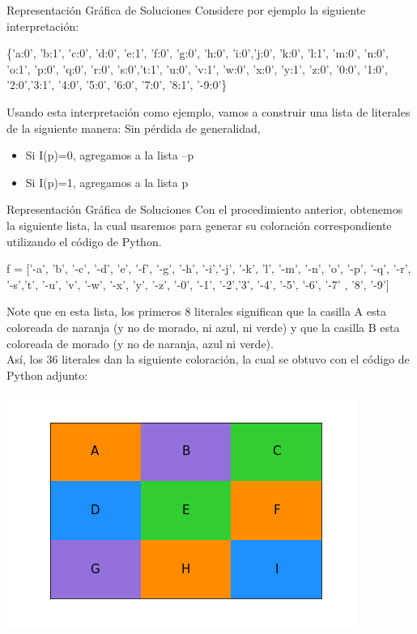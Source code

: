 \documentclass[10pt]{beamer}
\begin{document}
\begin{frame}{Representación Gráfica de Soluciones}
Considere por ejemplo la siguiente interpretación: \\
\begin{block}{}
 \{'a:0', 'b:1', 'c:0', 'd:0', 'e:1', 'f:0', 'g:0', 'h:0', 'i:0','j:0', 'k:0', 'l:1',
      'm:0', 'n:0', 'o:1', 'p:0', 'q:0', 'r:0', 's:0','t:1', 'u:0', 'v:1', 'w:0', 'x:0', 'y:1', 'z:0', '0:0', '1:0', '2:0','3:1', '4:0', '5:0', '6:0', '7:0', '8:1', '-9:0'\}
\end{block}
Usando esta interpretación como ejemplo, vamos a construir una lista de literales de la siguiente manera:
Sin pérdida de generalidad,
\begin{itemize}
\item Si I(p)=0, agregamos a la lista –p
\item Si I(p)=1, agregamos a la lista p
\end{itemize}

\end{frame}
\begin{frame}{Representación Gráfica de Soluciones}
Con el procedimiento anterior, obtenemos la siguiente lista, la cual usaremos para generar su coloración correspondiente utilizando el código de Python.
\begin{block}{}

f =  ['-a', 'b', '-c', '-d', 'e', '-f', '-g', '-h', '-i','-j', '-k', 'l',
      '-m', '-n', 'o', '-p', '-q', '-r', '-s','t', '-u', 'v', '-w', '-x', 'y', '-z', '-0', '-1', '-2','3', '-4', '-5', '-6', '-7'
      , '8', '-9']
      
\end{block}

\begin{multicols}{2}


Note que en esta lista, los primeros 8 literales significan que la casilla A esta coloreada de naranja (y no de morado, ni azul, ni verde) y que la casilla B esta coloreada de morado (y no de naranja, azul ni verde). \\
Así, los 36 literales dan la siguiente coloración, la cual se obtuvo con el código de Python adjunto:

\includegraphics[scale=0.40]{Images/MapaColor.png}

\end{multicols}

\end{frame}
\end{document}
